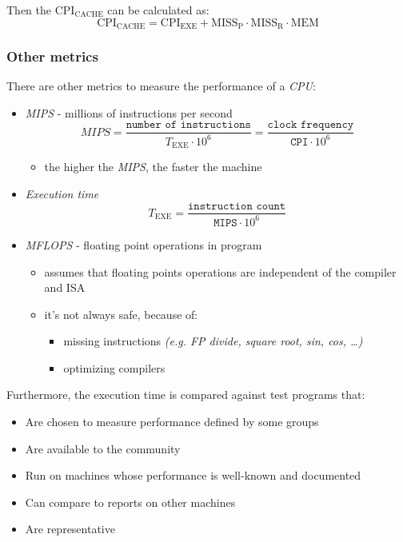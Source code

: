 \documentclass[english]{article}
\begin{document}
Then the \(\text{CPI}_{\text{CACHE}}\) can be calculated as:
\[ \text{CPI}_{\text{CACHE}} = \text{CPI}_\text{EXE} + \text{MISS}_\text{P} \cdot  \text{MISS}_\text{R} \cdot \text{MEM} \]

\subsubsection{Other metrics}

There are other metrics to measure the performance of a \textit{CPU}:

\begin{itemize}
  \item \textit{MIPS} - millions of instructions per second
        \[ MIPS = \dfrac{\texttt{number of instructions}}{T_\text{EXE} \cdot 10^6} = \dfrac{\texttt{clock frequency}}{\texttt{CPI} \cdot 10^6} \]
        \begin{itemize}
          \item the higher the \textit{MIPS}, the faster the machine
        \end{itemize}
  \item \textit{Execution time}
        \[ T_\text{EXE} = \dfrac{\texttt{instruction count}}{\texttt{MIPS} \cdot 10^6} \]
  \item \textit{MFLOPS} - floating point operations in program
        \begin{itemize}
          \item assumes that floating points operations are independent of the compiler and ISA
          \item it's not always safe, because of:
                \begin{itemize}
                  \item missing instructions \textit{(e.g. FP divide, square root, sin, cos, \dots)}
                  \item optimizing compilers
                \end{itemize}
        \end{itemize}
\end{itemize}

Furthermore, the execution time is compared against test programs that:

\begin{itemize}
  \item Are chosen to measure performance defined by some groups
  \item Are available to the community
  \item Run on machines whose performance is well-known and documented
  \item Can compare to reports on other machines
  \item Are representative
\end{itemize}
\end{document}
